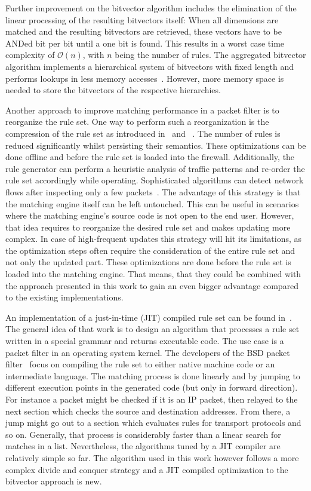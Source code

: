 \documentclass[conference]{IEEEtran}
\begin{document}
Further improvement on the bitvector algorithm includes the elimination of the linear processing of the resulting bitvectors itself:
When all dimensions are matched and the resulting bitvectors are retrieved, 
these vectors have to be ANDed bit per bit until a one bit is found.
This results in a worst case time complexity of $\mathcal O(n)$, with $n$ being the number of rules.
The aggregated bitvector algorithm implements a hierarchical system 
of bitvectors with fixed length and performs lookups in less memory accesses~\cite{abv}.
However, more memory space is needed to store the bitvectors of the respective hierarchies.

Another approach to improve matching performance in a packet filter is to reorganize the rule set.
One way to perform such a reorganization is the compression of the rule set as 
introduced in~\cite{redundancy_removal} and ~\cite{firewall_compressor}.
The number of rules is reduced significantly whilst persisting their semantics.
These optimizations can be done offline and before the rule set is loaded into the firewall.
Additionally, the rule generator can perform a heuristic analysis of  
traffic patterns and re-order the rule set accordingly while operating.
Sophisticated algorithms can detect network flows after inspecting only a few packets~\cite{trafficonthefly}.
The advantage of this strategy is that the matching engine itself can be left untouched.
This can be useful in scenarios where the matching engine's source code is not open to the end user.
However, that idea requires to reorganize the desired rule set and makes updating more complex.
In case of high-frequent updates this strategy will hit its limitations, 
as the optimization steps often require the consideration of the entire rule set and not only the updated part.
These optimizations are done before the rule set is loaded into the matching engine.
That means, that they could be combined with the approach presented in this work to
gain an even bigger advantage compared to the existing implementations.

An implementation of a just-in-time (JIT) compiled rule set can be found in~\cite{dpf}.
The general idea of that work is to design an algorithm that processes a rule set
written in a special grammar and returns executable code.
The use case is a packet filter in an operating system kernel.
The developers of the BSD packet filter~\cite{bpf,bpfplus} focus on compiling the rule set to 
either native machine code or an intermediate language.
The matching process is done linearly and by jumping to different execution 
points in the generated code (but only in forward direction).
For instance a packet might be checked if it is an IP packet, then relayed 
to the next section which checks the source and destination addresses.
From there, a jump might go out to a section which evaluates rules for transport protocols and so on.
Generally, that process is considerably faster than a linear search for matches in a list.
Nevertheless, the algorithms tuned by a JIT compiler are relatively simple so far.
The algorithm used in this work however follows a more complex divide and conquer strategy and a JIT compiled optimization 
to the bitvector approach is new.
\end{document}
